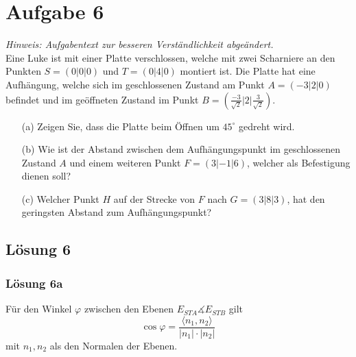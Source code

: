 \documentclass[main.tex]{subfiles}
\begin{document}
\section{Aufgabe 6}
\textit{Hinweis: Aufgabentext zur besseren Verständlichkeit abgeändert.}\\

Eine Luke ist mit einer Platte verschlossen, welche mit zwei Scharniere an den Punkten $S = (0|0|0)$ und $T = (0|4|0)$ montiert ist.
Die Platte hat eine Aufhängung, welche sich im geschlossenen Zustand am Punkt $A = (-3|2|0)$ befindet und im geöffneten Zustand im Punkt $B = (\frac{-3}{\sqrt{2}}|2|\frac{3}{\sqrt{2}})$.

\begin{enumerate}
    \item[(a)] Zeigen Sie, dass die Platte beim Öffnen um $45^{\circ}$ gedreht wird.
    \item[(b)] Wie ist der Abstand zwischen dem Aufhängungspunkt im geschlossenen Zustand $A$ und einem weiteren Punkt $F = (3|-1|6)$, welcher als Befestigung dienen soll?
    \item[(c)] Welcher Punkt $H$ auf der Strecke von $F$ nach $G = (3|8|3)$, hat den geringsten Abstand zum Aufhängungspunkt?
\end{enumerate}

\subsection{Lösung 6}

\subsubsection{Lösung 6a}
Für den Winkel $\varphi $ zwischen den Ebenen $E_{STA} \measuredangle E_{STB}$ gilt
\begin{equation*}
\cos \varphi =\frac{\langle n_{1} ,n_{2}\rangle }{| n_{1}| \cdotp | n_{2}| }
\end{equation*}
mit $n_{1} ,n_{2}$ als den Normalen der Ebenen.
\end{document}

